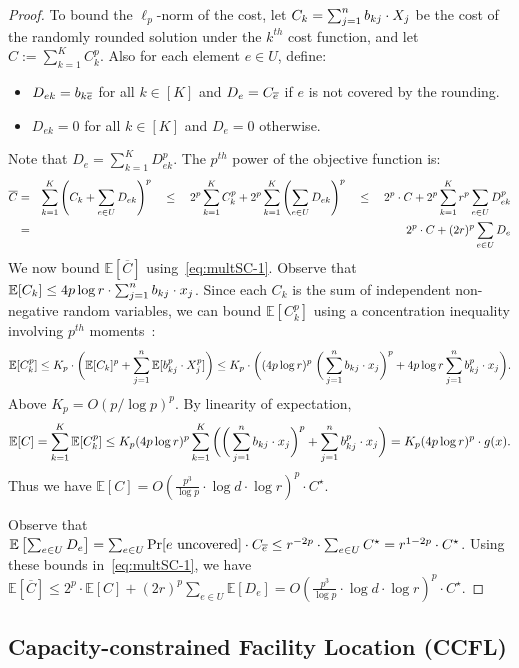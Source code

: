 \documentclass[letterpaper,11pt]{article}
\def\E{\mathbb{E}}
\begin{document}
\begin{proof}
  To bound the $\ell_p$-norm of the cost, let $C_k=\sum_{j=1}^n
  b_{kj}\cdot X_j$ be the cost of the randomly rounded solution under the
  $k^{th}$ cost function, and let $C:=\sum_{k=1}^K C_k^p$. Also for each element $e\in U$, define:
\begin{itemize}
\item $D_{ek}=b_{k{\overline{e}}}$ for all $k\in[K]$ and $D_e=C_{\overline{e}}$ if $e$ is not covered by the rounding.
\item  $D_{ek}=0$ for all $k\in[K]$ and $D_e=0$ otherwise.
\end{itemize}
Note that $D_e=\sum_{k=1}^K D_{ek}^p$.  The
  $p^{th}$ power of the objective function is:
\begin{eqnarray}
\overline{C} & =& \sum_{k=1}^K  \left(C_k +\sum_{e\in U} D_{ek}\right)^p \quad \le \quad 2^p \sum_{k=1}^K  C_k^p + 2^p \sum_{k=1}^K  \left(\sum_{e\in U} D_{ek}\right)^p \quad \le \quad  2^p \cdot C + 2^p \sum_{k=1}^K  r^p \sum_{e\in U} D_{ek}^p \notag \\
&=& 2^p \cdot C+ (2r)^p \sum_{e\in U} D_{e}  \label{eq:multSC-1}
\end{eqnarray}
We now bound $\E[\overline{C}]$ using~\eqref{eq:multSC-1}. Observe that $\E[C_k]\le
  4p\log r\cdot \sum_{j=1}^n \b_{kj}\cdot x_j$. Since each $C_k$ is the
  sum of independent non-negative random variables, we can bound $\E[C_k^p]$ using a
  concentration inequality involving $p^{th}$ moments~\cite{Latala}:
$$\E[C_k^p]  \le  K_p \cdot \bigg( \E[C_k]^p + \sum_{j=1}^n \E[\b_{kj}^p
\cdot X_j^p] \bigg) \le K_p \cdot \bigg( (4p\log r)^p \;
\bigg(\sum_{j=1}^n \b_{kj}\cdot x_j\bigg)^p + 4p\log r \sum_{j=1}^n
\b_{kj}^p \cdot x_j \bigg) .$$ Above $K_p=O(p/\log p)^p$. By linearity of
expectation,
$$\E[C] = \sum_{k=1}^K \E[C_k^p] \le K_p (4p\log r)^p \sum_{k=1}^K \bigg( \bigg(\sum_{j=1}^n \b_{kj}\cdot x_j\bigg)^p + \sum_{j=1}^n \b_{kj}^p \cdot x_j  \bigg)  = K_p (4p\log r)^p \cdot g(x).$$
Thus we have $\E[C] = O\left(\frac{p^3}{\log p}\cdot \log d\cdot \log
  r\right)^p\cdot C^\star$.

Observe that $\E\left[ \sum_{e\in U} D_{e}  \right] = \sum_{e\in U} \Pr[e\mbox{ uncovered}]\cdot C_\oe \le r^{-2p} \cdot \sum_{e\in U} C^\star = r^{1-2p}\cdot C^\star$. Using these bounds in~\eqref{eq:multSC-1}, we have $\E[\overline{C}] \le
2^p \cdot \E[C]+ (2r)^p \sum_{e\in U} \E[D_{e}]  = O\left(\frac{p^3}{\log p}\cdot \log d\cdot \log
  r\right)^p\cdot C^\star$. \end{proof}

\subsection{Capacity-constrained Facility Location (CCFL)}
\label{sec:CCFL}
\end{document}
